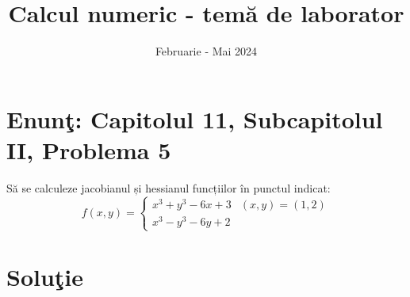 \documentclass{article}
\begin{document}
\title{Calcul numeric - tem\u{a} de laborator}

\author{}

\date{Februarie - Mai 2024}

\maketitle              %








\section*{Enun\c{t}: Capitolul 11, Subcapitolul II, Problema 5}

S\u{a} se calculeze jacobianul și hessianul funcțiilor în punctul indicat:
\[
f(x, y) = \begin{cases}
x^3 + y^3 - 6x + 3  & (x,y) = (1,2) \\
x^3 - y^3 - 6y + 2 
\end{cases}
\]

\section*{Solu\c{t}ie}
\end{document}
